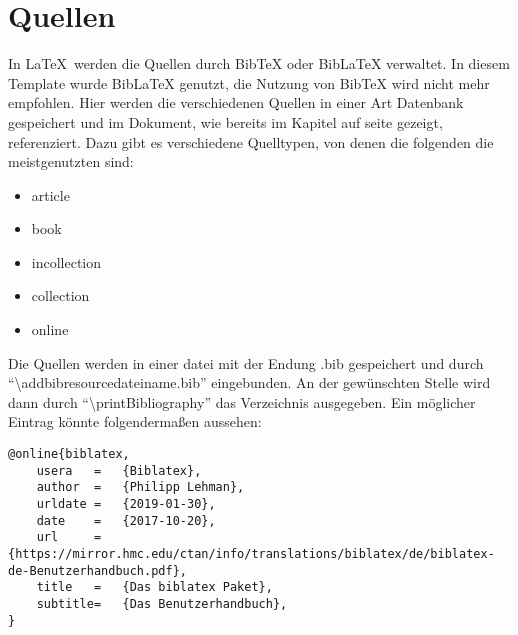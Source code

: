 
\chapter{Quellen}

In \LaTeX\ werden die Quellen durch BibTeX oder BibLaTeX verwaltet. 
In diesem Template wurde BibLaTeX genutzt, die Nutzung von BibTeX wird nicht mehr empfohlen.
Hier werden die verschiedenen Quellen in einer Art Datenbank gespeichert und im Dokument, wie bereits im Kapitel  auf seite \pageref{ch:zitieren} gezeigt, referenziert. 
Dazu gibt es verschiedene Quelltypen, von denen die folgenden die meistgenutzten sind:\autocite[Vgl.][7]{biblatex}

\begin{itemize}
  \item article
  \item book
  \item incollection
  \item collection
  \item online
\end{itemize}

Die Quellen werden in einer datei mit der Endung .bib gespeichert und durch \enquote{\textbackslash addbibresource{dateiname.bib}} eingebunden. 
An der gewünschten Stelle wird dann durch \enquote{\textbackslash printBibliography} das Verzeichnis ausgegeben. 
Ein möglicher Eintrag könnte folgendermaßen aussehen:

\begin{lstlisting}
@online{biblatex,
    usera	=	{Biblatex},
    author	=	{Philipp Lehman},
    urldate	=	{2019-01-30},
    date	=	{2017-10-20},
    url		=	{https://mirror.hmc.edu/ctan/info/translations/biblatex/de/biblatex-de-Benutzerhandbuch.pdf},
    title	=	{Das biblatex Paket},
    subtitle=   {Das Benutzerhandbuch},
}
\end{lstlisting}